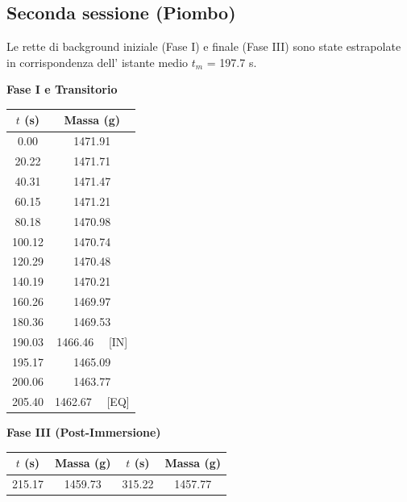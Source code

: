 \documentclass[a4paper,12pt]{article}
\begin{document}
\subsection{Seconda sessione (Piombo)}

Le rette di background iniziale (Fase I) e finale (Fase III) sono state estrapolate in corrispondenza dell'
istante medio $t_m$ = 197.7 s.

\begin{table}[htbp]
    \centering
    \footnotesize
    \noindent
    \begin{minipage}[t]{0.42\textwidth}
        \centering
        \textbf{Fase I e Transitorio} \\
        \vspace{0.2cm}
        \begin{tabular}{cc}
            \hline
            $t$ (s) & Massa (g) \\ \hline
            0.00 & 1471.91 \\
            20.22 & 1471.71 \\
            40.31 & 1471.47 \\
            60.15 & 1471.21 \\
            80.18 & 1470.98 \\
            100.12 & 1470.74 \\
            120.29 & 1470.48 \\
            140.19 & 1470.21 \\
            160.26 & 1469.97 \\
            180.36 & 1469.53 \\
            190.03 & 1466.46 \ \ [IN] \\
            195.17 & 1465.09 \\
            200.06 & 1463.77 \\
            205.40 & 1462.67 \ \ [EQ] \\ \hline
        \end{tabular}
    \end{minipage}
    \hfill
    \begin{minipage}[t]{0.54\textwidth}
        \centering
        \textbf{Fase III (Post-Immersione)} \\
        \vspace{0.2cm}
        \begin{tabular}{cc|cc}
            \hline
            $t$ (s) & Massa (g) & $t$ (s) & Massa (g) \\ \hline
            215.17 & 1459.73 & 315.22 & 1457.77 \\

\end{tabular}
\end{minipage}
\end{table}
\end{document}
